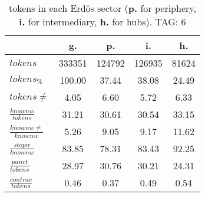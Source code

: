 \begin{table}[h!]
\begin{center}
\begin{tabular}{| l || c | c | c | c |}\hline
 & {\bf g.} & {\bf p.} & {\bf i.} & {\bf h.} \\\hline\hline
$tokens$ & 333351  & 124792  & 126935  & 81624 \\
$tokens_{\%}$ & 100.00  & 37.44  & 38.08  & 24.49 \\
$tokens \neq$ & 4.05  & 6.60  & 5.72  & 6.33 \\\hline
$\frac{knownw}{tokens}$ & 31.21  & 30.61  & 30.54  & 33.15 \\
$\frac{knownw \neq}{knownw}$ & 5.26  & 9.05  & 9.17  & 11.62 \\\hline
$\frac{stopw}{knownw}$ & 83.85  & 78.31  & 83.43  & 92.25 \\
$\frac{punct}{tokens}$ & 28.97  & 30.76  & 30.21  & 24.31 \\
$\frac{contrac}{tokens}$ & 0.46  & 0.37  & 0.49  & 0.54 \\\hline
\end{tabular}
\caption{tokens in each Erd\"os sector ({{\bf p.}} for periphery, {{\bf i.}} for intermediary, 
    {{\bf h.}} for hubs). TAG: 6}
\end{center}
\end{table}
